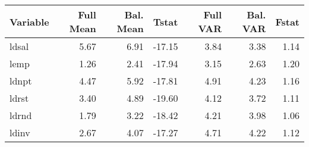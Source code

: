 \begin{tabular}{lrrrrrr}
  \hline
Variable & Full Mean & Bal. Mean & Tstat & Full VAR & Bal. VAR & Fstat \\ 
  \hline
ldsal & 5.67 & 6.91 & -17.15 & 3.84 & 3.38 & 1.14 \\ 
  lemp & 1.26 & 2.41 & -17.94 & 3.15 & 2.63 & 1.20 \\ 
  ldnpt & 4.47 & 5.92 & -17.81 & 4.91 & 4.23 & 1.16 \\ 
  ldrst & 3.40 & 4.89 & -19.60 & 4.12 & 3.72 & 1.11 \\ 
  ldrnd & 1.79 & 3.22 & -18.42 & 4.21 & 3.98 & 1.06 \\ 
  ldinv & 2.67 & 4.07 & -17.27 & 4.71 & 4.22 & 1.12 \\ 
   \hline
\end{tabular}
